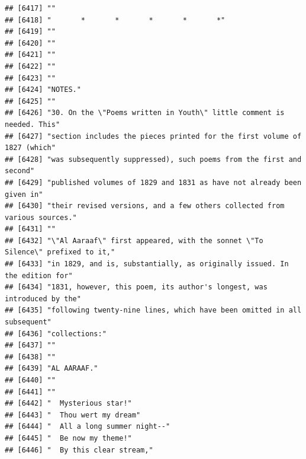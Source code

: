\documentclass{article}\usepackage[]{graphicx}\usepackage[]{color}
\makeatletter
\newenvironment{kframe}{%
 \def\at@end@of@kframe{}%
 \ifinner\ifhmode%
  \def\at@end@of@kframe{\end{minipage}}%
  \begin{minipage}{\columnwidth}%
 \fi\fi%
 \def\FrameCommand##1{\hskip\@totalleftmargin \hskip-\fboxsep
 \colorbox{shadecolor}{##1}\hskip-\fboxsep
     \hskip-\linewidth \hskip-\@totalleftmargin \hskip\columnwidth}%
 \MakeFramed {\advance\hsize-\width
   \@totalleftmargin\z@ \linewidth\hsize
   \@setminipage}}%
 {\par\unskip\endMakeFramed%
 \at@end@of@kframe}
\newenvironment{knitrout}{}{} %
\makeatother
\begin{document}
\begin{knitrout}
\begin{kframe}
\begin{verbatim}
## [6417] ""                                                                            
## [6418] "       *       *       *       *       *"                                    
## [6419] ""                                                                            
## [6420] ""                                                                            
## [6421] ""                                                                            
## [6422] ""                                                                            
## [6423] ""                                                                            
## [6424] "NOTES."                                                                      
## [6425] ""                                                                            
## [6426] "30. On the \"Poems written in Youth\" little comment is needed. This"        
## [6427] "section includes the pieces printed for the first volume of 1827 (which"     
## [6428] "was subsequently suppressed), such poems from the first and second"          
## [6429] "published volumes of 1829 and 1831 as have not already been given in"        
## [6430] "their revised versions, and a few others collected from various sources."    
## [6431] ""                                                                            
## [6432] "\"Al Aaraaf\" first appeared, with the sonnet \"To Silence\" prefixed to it,"
## [6433] "in 1829, and is, substantially, as originally issued. In the edition for"    
## [6434] "1831, however, this poem, its author's longest, was introduced by the"       
## [6435] "following twenty-nine lines, which have been omitted in all subsequent"      
## [6436] "collections:"                                                                
## [6437] ""                                                                            
## [6438] ""                                                                            
## [6439] "AL AARAAF."                                                                  
## [6440] ""                                                                            
## [6441] ""                                                                            
## [6442] "  Mysterious star!"                                                          
## [6443] "  Thou wert my dream"                                                        
## [6444] "  All a long summer night--"                                                 
## [6445] "  Be now my theme!"                                                          
## [6446] "  By this clear stream,"                                                     

\end{verbatim}
\end{kframe}
\end{knitrout}
\end{document}
